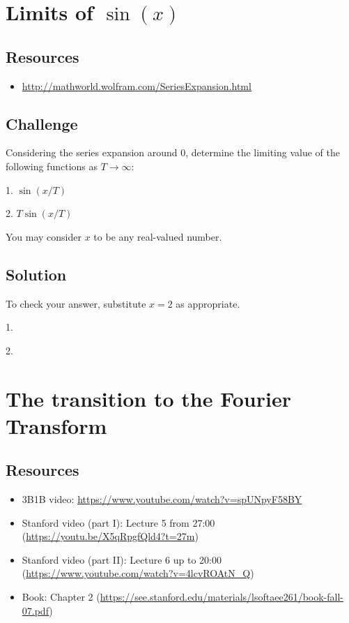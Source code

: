 \newpage
\section{Limits of $\sin(x)$}

\subsection*{Resources}
\begin{itemize}
    \item \url{http://mathworld.wolfram.com/SeriesExpansion.html}
\end{itemize}

\subsection*{Challenge}
Considering the series expansion around $0$, determine the limiting value of the following functions as $T \rightarrow \infty$:

1. $\sin(x/T)$

2. $T \sin(x/T)$

You may consider $x$ to be any real-valued number.

\subsection*{Solution}
To check your answer, substitute $x=2$ as appropriate.

1.\\

2.\\




\newpage
\section{The transition to the Fourier Transform}

\subsection*{Resources}
\begin{itemize}
    \item 3B1B video: \url{https://www.youtube.com/watch?v=spUNpyF58BY}
    \item Stanford video (part I): Lecture 5 from 27:00 (\url{https://youtu.be/X5qRpgfQld4?t=27m})
    \item Stanford video (part II): Lecture 6 up to 20:00 (\url{https://www.youtube.com/watch?v=4lcvROAtN_Q})
    \item Book: Chapter 2 (\url{https://see.stanford.edu/materials/lsoftaee261/book-fall-07.pdf})
\end{itemize}

